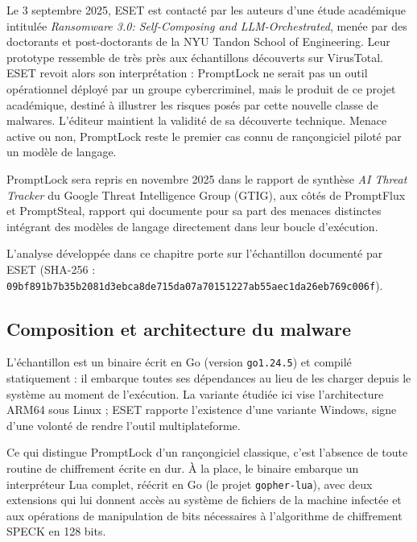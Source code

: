 Le 3 septembre 2025, ESET est contacté par les auteurs d'une étude académique intitulée \emph{Ransomware 3.0: Self-Composing and LLM-Orchestrated}, menée par des doctorants et post-doctorants de la NYU Tandon School of Engineering. Leur prototype ressemble de très près aux échantillons découverts sur VirusTotal. ESET revoit alors son interprétation : PromptLock ne serait pas un outil opérationnel déployé par un groupe cybercriminel, mais le produit de ce projet académique, destiné à illustrer les risques posés par cette nouvelle classe de malwares. L'éditeur maintient la validité de sa découverte technique. Menace active ou non, PromptLock reste le premier cas connu de rançongiciel piloté par un modèle de langage.

PromptLock sera repris en novembre 2025 dans le rapport de synthèse \emph{AI Threat Tracker} du Google Threat Intelligence Group (GTIG), aux côtés de PromptFlux et PromptSteal, rapport qui documente pour sa part des menaces distinctes intégrant des modèles de langage directement dans leur boucle d'exécution.

L'analyse développée dans ce chapitre porte sur l'échantillon documenté par ESET (SHA-256 : \texttt{09bf891b\allowbreak7b35b208\allowbreak1d3ebca8\allowbreak de715da0\allowbreak7a701512\allowbreak27ab55ae\allowbreak c1da26eb\allowbreak769c006f}).

\subsection{Composition et architecture du malware}

L'échantillon est un binaire écrit en Go (version \texttt{go1.24.5}) et compilé statiquement : il embarque toutes ses dépendances au lieu de les charger depuis le système au moment de l'exécution. La variante étudiée ici vise l'architecture ARM64 sous Linux ; ESET rapporte l'existence d'une variante Windows, signe d'une volonté de rendre l'outil multiplateforme.

Ce qui distingue PromptLock d'un rançongiciel classique, c'est l'absence de toute routine de chiffrement écrite en dur. À la place, le binaire embarque un interpréteur Lua complet, réécrit en Go (le projet \texttt{gopher-lua}), avec deux extensions qui lui donnent accès au système de fichiers de la machine infectée et aux opérations de manipulation de bits nécessaires à l'algorithme de chiffrement SPECK en 128 bits.


